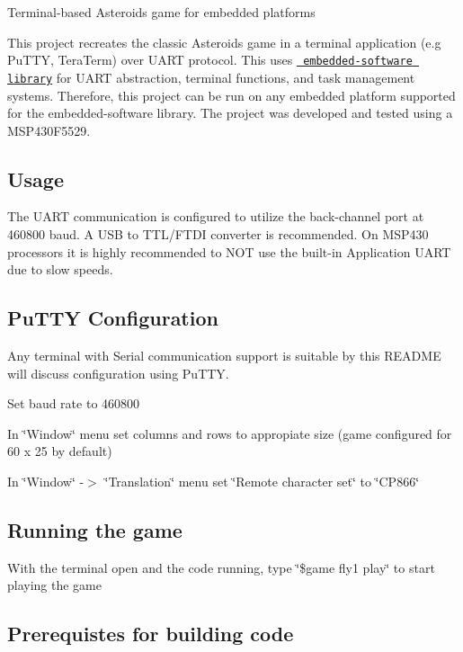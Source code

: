 Terminal-\/based Asteroids game for embedded platforms

This project recreates the classic Asteroids game in a terminal application (e.\+g Pu\+T\+TY, Tera\+Term) over U\+A\+RT protocol. This uses \href{https://github.com/muhlbaier/embedded-software}{\texttt{ embedded-\/software library}} for U\+A\+RT abstraction, terminal functions, and task management systems. Therefore, this project can be run on any embedded platform supported for the embedded-\/software library. The project was developed and tested using a M\+S\+P430\+F5529.

\subsection*{Usage}

The U\+A\+RT communication is configured to utilize the back-\/channel port at 460800 baud. A U\+SB to T\+T\+L/\+F\+T\+DI converter is recommended. On M\+S\+P430 processors it is highly recommended to N\+OT use the built-\/in Application U\+A\+RT due to slow speeds.

\subsection*{Pu\+T\+TY Configuration}

Any terminal with Serial communication support is suitable by this R\+E\+A\+D\+ME will discuss configuration using Pu\+T\+TY.
\begin{DoxyItemize}
\item Set baud rate to 460800
\item In \char`\"{}\+Window\char`\"{} menu set columns and rows to appropiate size (game configured for 60 x 25 by default)
\item In \char`\"{}\+Window\char`\"{} -\/$>$ \char`\"{}\+Translation\char`\"{} menu set \char`\"{}\+Remote character set\char`\"{} to \char`\"{}\+C\+P866\char`\"{}
\end{DoxyItemize}

\subsection*{Running the game}

With the terminal open and the code running, type \char`\"{}\$game fly1 play\char`\"{} to start playing the game

\subsection*{Prerequistes for building code}

